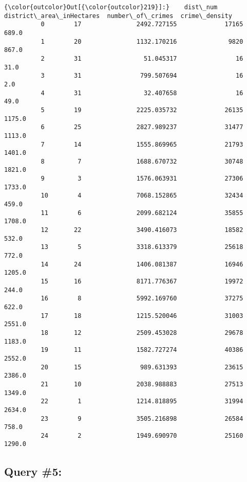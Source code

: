 \documentclass[11pt]{article}
\begin{document}
\begin{Verbatim}[commandchars=\\\{\}]
{\color{outcolor}Out[{\color{outcolor}219}]:}    dist\_num  district\_area\_inHectares  number\_of\_crimes  crime\_density
          0        17               2492.727155             17165          689.0
          1        20               1132.170216              9820          867.0
          2        31                 51.045317                16           31.0
          3        31                799.507694                16            2.0
          4        31                 32.407658                16           49.0
          5        19               2225.035732             26135         1175.0
          6        25               2827.989237             31477         1113.0
          7        14               1555.869965             21793         1401.0
          8         7               1688.670732             30748         1821.0
          9         3               1576.063931             27306         1733.0
          10        4               7068.152865             32434          459.0
          11        6               2099.682124             35855         1708.0
          12       22               3490.416073             18582          532.0
          13        5               3318.613379             25618          772.0
          14       24               1406.081387             16946         1205.0
          15       16               8171.776367             19972          244.0
          16        8               5992.169760             37275          622.0
          17       18               1215.520046             31003         2551.0
          18       12               2509.453028             29678         1183.0
          19       11               1582.727274             40386         2552.0
          20       15                989.631393             23615         2386.0
          21       10               2038.988883             27513         1349.0
          22        1               1214.818895             31994         2634.0
          23        9               3505.216898             26584          758.0
          24        2               1949.690970             25160         1290.0
\end{Verbatim}
            
    \hypertarget{query-5}{%
\subsection{Query \#5:}\label{query-5}}
\end{document}
